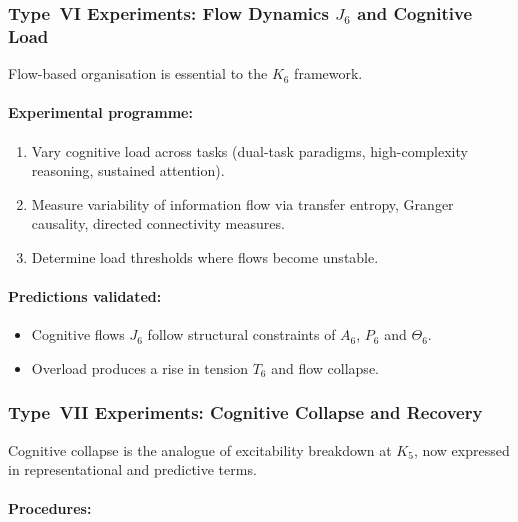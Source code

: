 \subsubsection{Type~VI Experiments: Flow Dynamics \texorpdfstring{$J_6$}{J_6} and Cognitive Load}

Flow-based organisation is essential to the $K_6$ framework.

\paragraph{Experimental programme:}

\begin{enumerate}
    \item Vary cognitive load across tasks (dual-task paradigms,
          high-complexity reasoning, sustained attention).
    \item Measure variability of information flow 
          via transfer entropy, Granger causality,
          directed connectivity measures.
    \item Determine load thresholds where flows become unstable.
\end{enumerate}

\paragraph{Predictions validated:}

\begin{itemize}
    \item Cognitive flows $J_6$ follow structural constraints of $A_6$,
          $P_6$ and $\Theta_6$.
    \item Overload produces a rise in tension $T_6$ and 
          flow collapse.
\end{itemize}



\subsubsection{Type~VII Experiments: Cognitive Collapse and Recovery}

Cognitive collapse is the analogue of excitability breakdown at $K_5$,
now expressed in representational and predictive terms.

\paragraph{Procedures:}

